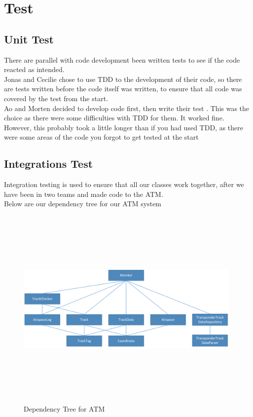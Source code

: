 	\section{Test}
	
	\subsection{Unit Test}
	There are parallel with code development been written tests to see if the code reacted as intended. \\
	
	\noindent Jonas and Cecilie chose to use TDD to the development of their code, so there are tests written before the code itself was written, to ensure that all code was covered by the test from the start. \\
	
	\noindent Ao and Morten decided to develop code first, then write their test . This was the choice as there were some difficulties with TDD for them. It worked fine. However, this probably took a little longer than if you had used TDD, as there were some areas of the code you forgot to get tested at the start \\
	
	
	\subsection{Integrations Test}
	Integration testing is used to ensure that all our classes work together, after we have been in two teams and made ​code to the ATM. \\
	Below are our dependency tree for our ATM system
	
	\begin{figure} [!ht]
		\begin{center}
			\includegraphics[height=10cm, width=11cm]{Images/Dependencytree}
		\end{center}
		\caption{Dependency Tree for ATM}
		\label{fig:DependencyTree}
	\end{figure}
	\pagebreak
	
